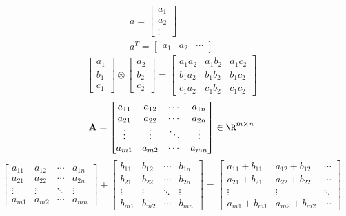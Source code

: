\documentclass[../SOP.tex]{subfile}
\begin{document}
\begin{gather*}
  a=\begin{bmatrix}
    a_1 \\ a_2 \\ \vdots
  \end{bmatrix}
  \\
  a^T=\begin{bmatrix}
    a_1 & a_2 & \cdots
  \end{bmatrix}
\end{gather*}
\begin{equation*}
  \begin{bmatrix}
    a_1 \\ b_1 \\ c_1
  \end{bmatrix}
  \otimes
  \begin{bmatrix}
    a_2 \\ b_2 \\ c_2
  \end{bmatrix}
  =
  \begin{bmatrix}
  a_1a_2 & a_1b_2 & a_1c_2 \\
  b_1a_2 & b_1b_2 & b_1c_2 \\
  c_1a_2 & c_1b_2 & c_1c_2
  \end{bmatrix}
\end{equation*}
\begin{equation*}
  \mathbf{A}=\begin{bmatrix}
    a_{11} & a_{12} & \cdots & a_{1n} \\
    a_{21} & a_{22} & \cdots & a_{2n} \\
    \vdots & \vdots & \ddots & \vdots \\
    a_{m1} & a_{m2} & \cdots & a_{mn}
  \end{bmatrix}
  \in \R^{m\times n}
\end{equation*}
\begin{equation*}
  \begin{bmatrix}
    a_{11} & a_{12} & \cdots & a_{1n} \\
    a_{21} & a_{22} & \cdots & a_{2n} \\
    \vdots & \vdots & \ddots & \vdots \\
    a_{m1} & a_{m2} & \cdots & a_{mn}
  \end{bmatrix}
  +
  \begin{bmatrix}
    b_{11} & b_{12} & \cdots & b_{1n} \\
    b_{21} & b_{22} & \cdots & b_{2n} \\
    \vdots & \vdots & \ddots & \vdots \\
    b_{m1} & b_{m2} & \cdots & b_{mn}
  \end{bmatrix}
  =
  \begin{bmatrix}
    a_{11} + b_{11} & a_{12} + b_{12} & \cdots \\
    a_{21} + b_{21} & a_{22} + b_{22} & \cdots \\
    \vdots & \vdots & \ddots \\
    a_{m1} + b_{m1} & a_{m2} + b_{m2} & \cdots 
  \end{bmatrix}
\end{equation*}
\end{document}
